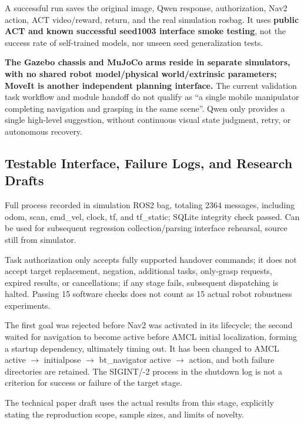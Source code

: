A successful run saves the original image, Qwen response, authorization, Nav2 action, ACT video/reward, return, and the real simulation rosbag. It uses \textbf{public ACT and known successful seed1003 interface smoke testing}, not the success rate of self-trained models, nor unseen seed generalization tests.

\textbf{The Gazebo chassis and MuJoCo arms reside in separate simulators, with no shared robot model/physical world/extrinsic parameters; MoveIt is another independent planning interface.} The current validation task workflow and module handoff do not qualify as ``a single mobile manipulator completing navigation and grasping in the same scene''. Qwen only provides a single high-level suggestion, without continuous visual state judgment, retry, or autonomous recovery.


\subsection{Testable Interface, Failure Logs, and Research Drafts}\label{s04-detail-6}

Full process recorded in simulation ROS2 bag, totaling 2364 messages, including odom, scan, cmd\_vel, clock, tf, and tf\_static; SQLite integrity check passed. Can be used for subsequent regression collection/parsing interface rehearsal, source still from simulator.

Task authorization only accepts fully supported handover commands; it does not accept target replacement, negation, additional tasks, only-grasp requests, expired results, or cancellations; if any stage fails, subsequent dispatching is halted. Passing 15 software checks does not count as 15 actual robot robustness experiments.

The first goal was rejected before Nav2 was activated in its lifecycle; the second waited for navigation to become active before AMCL initial localization, forming a startup dependency, ultimately timing out. It has been changed to AMCL active \(\rightarrow\) initialpose \(\rightarrow\) bt\_navigator active \(\rightarrow\) action, and both failure directories are retained. The SIGINT/-2 process in the shutdown log is not a criterion for success or failure of the target stage.

The technical paper draft uses the actual results from this stage, explicitly stating the reproduction scope, sample sizes, and limits of novelty.

